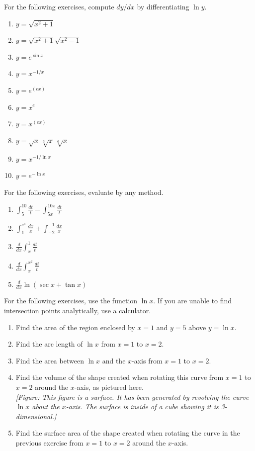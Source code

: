 \documentclass{exercises}
\begin{document}
For the following exercises, compute $dy/dx$ by differentiating $\ln y$.

\begin{enumerate}[resume]
\item $y=\sqrt{x^{2}+1}$
\item $y=\sqrt{x^{2}+1}\sqrt{x^{2}-1}$
\item $y=e^{\sin x}$
\item $y=x^{-1/x}$
\item $y=e^{(ex)}$
\item $y=x^{e}$
\item $y=x^{(ex)}$
\item $y=\sqrt{x}\,\sqrt[3]{x}\,\sqrt[6]{x}$
\item $y=x^{-1/\ln x}$
\item $y=e^{-\ln x}$
\end{enumerate}

For the following exercises, evaluate by any method.

\begin{enumerate}[resume]
\item $\int_{5}^{10}\frac{dt}{t}-\int_{5x}^{10x}\frac{dt}{t}$
\item $\int_{1}^{e^{\pi}}\frac{dx}{x}+\int_{-2}^{-1}\frac{dx}{x}$
\item $\frac{d}{dx}\int_{x}^{1}\frac{dt}{t}$
\item $\frac{d}{dx}\int_{x}^{x^{2}}\frac{dt}{t}$
\item $\frac{d}{dx}\ln(\sec x+\tan x)$
\end{enumerate}

For the following exercises, use the function $\ln x$. If you are unable to find intersection points analytically, use a calculator.

\begin{enumerate}[resume]
\item Find the area of the region enclosed by $x=1$ and $y=5$ above $y=\ln x$.
\item \techrequired Find the arc length of $\ln x$ from $x=1$ to $x=2$.
\item Find the area between $\ln x$ and the $x$-axis from $x=1$ to $x=2$.
\item Find the volume of the shape created when rotating this curve from $x=1$ to $x=2$ around the $x$-axis, as pictured here. \\ \textit{[Figure: This figure is a surface. It has been generated by revolving the curve $\ln x$ about the $x$-axis. The surface is inside of a cube showing it is 3-dimensional.]}
\item \techrequired Find the surface area of the shape created when rotating the curve in the previous exercise from $x=1$ to $x=2$ around the $x$-axis.
\end{enumerate}
\end{document}
